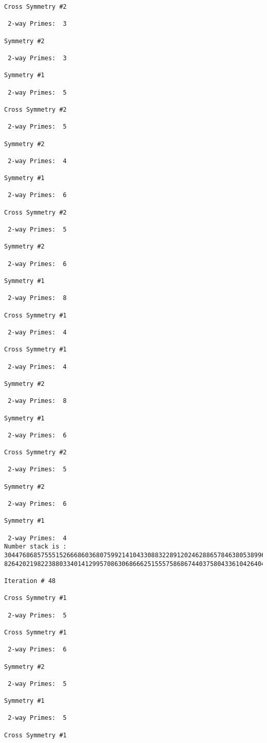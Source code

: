 {{{{\begin{verbatim}
Cross Symmetry #2

 2-way Primes: 	3

Symmetry #2

 2-way Primes: 	3

Symmetry #1

 2-way Primes: 	5

Cross Symmetry #2

 2-way Primes: 	5

Symmetry #2

 2-way Primes: 	4

Symmetry #1

 2-way Primes: 	6

Cross Symmetry #2

 2-way Primes: 	5

Symmetry #2

 2-way Primes: 	6

Symmetry #1

 2-way Primes: 	8

Cross Symmetry #1

 2-way Primes: 	4

Cross Symmetry #1

 2-way Primes: 	4

Symmetry #2

 2-way Primes: 	8

Symmetry #1

 2-way Primes: 	6

Cross Symmetry #2

 2-way Primes: 	5

Symmetry #2

 2-way Primes: 	6

Symmetry #1

 2-way Primes: 	4
Number stack is :
30447686857555152666860368075992141043308832289120246288657846380538996794608835958544046240163340857
82642021982238803340141299570863068666251555758686744037580433610426404458595388064976998350836487568

Iteration #	48

Cross Symmetry #1

 2-way Primes: 	5

Cross Symmetry #1

 2-way Primes: 	6

Symmetry #2

 2-way Primes: 	5

Symmetry #1

 2-way Primes: 	5

Cross Symmetry #1


\end{verbatim}}}}}
